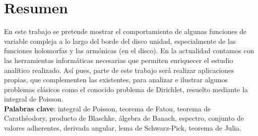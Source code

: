 %
%
%
%
%

\chapter{Resumen}

En este trabajo se pretende mostrar el comportamiento de algunas funciones de variable compleja a lo largo del borde del disco unidad, especialmente de las funciones holomorfas y las armónicas (en el disco). En la actualidad contamos con las herramientas informáticas necesarias que permiten enriquecer el estudio analítico realizado. Así pues, parte de este trabajo será realizar aplicaciones propias, que complementen las existentes, para analizar e ilustrar algunos problemas clásicos como el conocido problema de Dirichlet, resuelto mediante la integral de Poisson. \\

\textbf{Palabras clave}: integral de Poisson, teorema de Fatou, teorema de Carathéodory, producto de Blaschke, álgebra de Banach, espectro, conjunto de valores adherentes, derivada angular, lema de Schwarz-Pick, teorema de Julia. \\

\endinput
